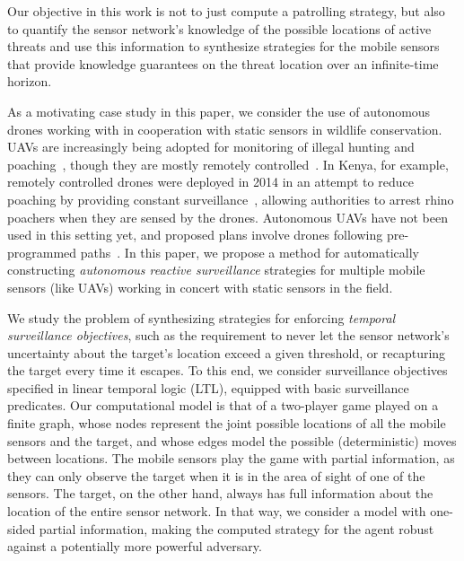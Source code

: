 Our objective in this work  is not to just compute a patrolling strategy, but also to quantify the sensor network's knowledge of the possible locations of active threats and use this information to synthesize strategies for the mobile sensors that provide knowledge guarantees on the threat location over an infinite-time horizon.

As a motivating case study in this paper, we consider the use of autonomous drones working with in cooperation with static sensors in wildlife conservation. UAVs are increasingly being adopted for monitoring of illegal hunting and poaching~\cite{schiffman2014drones}, though they are mostly remotely controlled~\cite{mulero2014remotely}. In Kenya, for example, remotely controlled drones were deployed in 2014 in an attempt to reduce poaching  by providing constant surveillance~\cite{Kenya}, allowing authorities to arrest rhino poachers when they are sensed by the drones. Autonomous UAVs  have not been used in this setting yet, and proposed plans involve drones following pre-programmed paths~\cite{Koh12}. In this paper, we propose a method for automatically constructing  \emph{autonomous reactive surveillance} strategies for multiple mobile sensors (like UAVs) working in concert with static sensors in the field. 

We study the problem of synthesizing strategies for enforcing \emph{temporal surveillance objectives}, such as the requirement to never let the sensor network's uncertainty about the target's location exceed a given threshold, or recapturing the target every time it escapes. To this end, we consider surveillance objectives specified in linear temporal logic (LTL), equipped with basic surveillance predicates. Our computational model is that of a two-player game played on a finite graph, whose nodes represent the joint possible locations of all the mobile sensors and the target, and whose edges model the possible (deterministic) moves between locations. The mobile sensors play the game with partial information, as they can only observe the target when  it is in the area of sight of one of the sensors. The target, on the other hand, always has full information about the location of the entire sensor network. In that way, we consider a model with one-sided partial information, making the computed strategy for the agent robust against a potentially more powerful adversary. 

